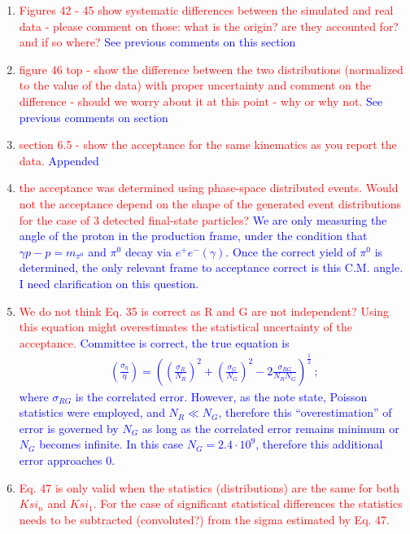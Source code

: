 \documentclass[11pt,a4paper]{article}
\begin{document}
\begin{enumerate}
\item
\textcolor{red}{Figures 42 - 45 show systematic differences between the simulated and real data - please comment on those: what is the origin? are they accounted for? and if so where?}
\textcolor{blue}{See previous comments on this section}
\item
\textcolor{red}{figure 46 top - show the difference between the two distributions (normalized to the value of the data) with proper uncertainty and comment on the difference - should we worry about it at this point - why or why not.}
\textcolor{blue}{See previous comments on section}
\item
\textcolor{red}{section 6.5 - show the acceptance for the same kinematics as you report the data.}
\textcolor{blue}{Appended}
\item
\textcolor{red}{the acceptance was determined using phase-space distributed events. Would not the acceptance depend on the shape of the generated event distributions for the case of 3 detected final-state particles?}
\textcolor{blue}{We are only measuring the angle of the proton in the production frame, under the condition that $\gamma p - p = m_{\pi^0}$ and $\pi^{0}$ decay via $e^+e^-(\gamma)$. Once the correct yield of $\pi^{0}$ is determined, the only relevant frame to acceptance correct is this C.M. angle. I need clarification on this question.}
\item
\textcolor{red}{We do not think Eq. 35 is correct as R and G are not independent? Using this equation might overestimates the statistical uncertainty of the acceptance.}
\textcolor{blue}{Committee is correct, the true equation is 
\begin{align}\label{eq:acceptance.error}
\left(\frac{\sigma_\eta}{\eta}\right) = \left(\left(\frac{\sigma_R}{N_R}\right)^2 +\left(\frac{\sigma_G}{N_G}\right)^2 - 2\frac{\sigma_{RG}}{N_R N_G} \right)^{\frac{1}{2}} \ ;
\end{align}
where $\sigma_{RG}$ is the correlated error. However, as the note state, Poisson statistics were employed, and $N_R \ll N_G$, therefore this ``overestimation'' of error is governed by $N_G$ as long as the correlated error remains minimum or $N_G$ becomes infinite. In this case $N_G = 2.4\cdot 10^9$, therefore this additional error approaches 0. 
}
\item
\textcolor{red}{Eq. 47 is only valid when the statistics (distributions) are the same for both $Ksi_n$ and $Ksi_1$. For the case of significant statistical differences the statistics needs to be subtracted (convoluted?) from the sigma estimated by Eq. 47.}

\end{enumerate}
\end{document}
